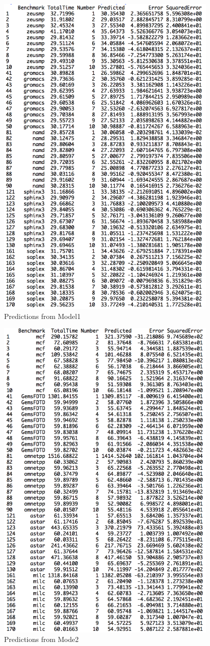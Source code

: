 \documentclass[a4paper,10pt,twoside]{article}
\begin{document}
\begin{figure}[h]
\centering
\includegraphics[width=400px]{pred1.png} 
\caption{Predictions from Model1}
\end{figure}
\begin{figure}[h]
\centering
\includegraphics[width=400px]{pred2.png} 
\caption{Predictions from Mode2}
\end{figure}
\end{document}
